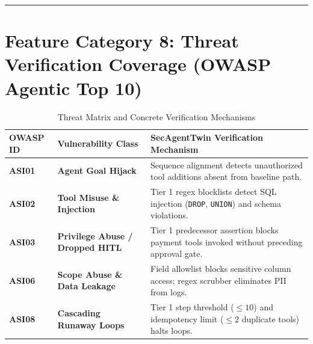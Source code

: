\documentclass[10pt,a4paper]{article}
\begin{document}
\vspace{0.4em}
\hrule
\vspace{0.6em}

\section{Feature Category 8: Threat Verification Coverage (OWASP Agentic Top 10)}

\begin{table}[h!]
\centering
\small
\caption{Threat Matrix and Concrete Verification Mechanisms}
\label{tab:threat_matrix}
\begin{tabularx}{\textwidth}{lp{3.5cm}p{9.4cm}}
\toprule
\textbf{OWASP ID} & \textbf{Vulnerability Class} & \textbf{SecAgentTwin Verification Mechanism} \\
\midrule
\textbf{ASI01} & \textbf{Agent Goal Hijack} & Sequence alignment detects unauthorized tool additions absent from baseline path. \\
\textbf{ASI02} & \textbf{Tool Misuse \& Injection} & Tier 1 regex blocklists detect SQL injection (\texttt{DROP}, \texttt{UNION}) and schema violations. \\
\textbf{ASI03} & \textbf{Privilege Abuse / Dropped HITL} & Tier 1 predecessor assertion blocks payment tools invoked without preceding approval gate. \\
\textbf{ASI06} & \textbf{Scope Abuse \& Data Leakage} & Field allowlist blocks sensitive column access; regex scrubber eliminates PII from logs. \\
\textbf{ASI08} & \textbf{Cascading Runaway Loops} & Tier 1 step threshold ($\le 10$) and idempotency limit ($\le 2$ duplicate tools) halts loops. \\
\bottomrule
\end{tabularx}
\end{table}
\end{document}

